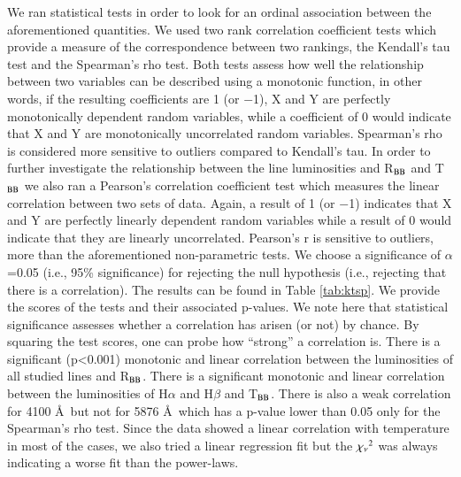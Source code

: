 \documentclass[structabstract]{aa}
\begin{document}
We ran statistical tests in order to look for an ordinal association between the aforementioned quantities. We used two rank correlation coefficient tests which provide a measure of the correspondence between two rankings, the Kendall's tau test and the Spearman's rho test. Both tests assess how well the relationship between two variables can be described using a monotonic function, in other words, if the resulting coefficients are 1 (or $-$1), X and Y are perfectly monotonically dependent random variables, while a coefficient of 0 would indicate that X and Y are monotonically uncorrelated random variables. Spearman's rho is considered more sensitive to outliers compared to Kendall's tau. %
In order to further investigate the relationship between the line luminosities and R$_{\rm BB}$ and T$_{\rm BB}$ we also ran a Pearson's correlation coefficient test which measures the linear correlation between two sets of data. Again, a result of 1 (or $-$1) indicates that X and Y are perfectly linearly dependent random variables while a result of 0 would indicate that they are linearly uncorrelated. Pearson's r is sensitive to outliers, more than the aforementioned non-parametric tests. We choose a significance of $\alpha$=0.05 (i.e., 95\% significance) for rejecting the null hypothesis (i.e., rejecting that there is a correlation). The results can be found in Table \ref{tab:ktsp}. We provide the scores of the tests and their associated p-values. 
We note here that statistical significance assesses whether a correlation has arisen (or not) by chance. By squaring the test scores, one can probe how ``strong'' a correlation is.
There is a significant (p<0.001) monotonic and linear correlation between the luminosities of all studied lines and R$_{\rm BB}$. There is a significant monotonic and linear correlation between the luminosities of H$\alpha$ and H$\beta$ and T$_{\rm BB}$. There is also a weak correlation for  4100 \AA\, but not for  5876 \AA\, which has a p-value lower than 0.05 only for the Spearman's rho test. Since the data showed a linear correlation with temperature in most of the cases, we also tried a linear regression fit but the ${\rm \chi_{\rm \nu}}^{2}$ was always indicating a worse fit than the power-laws. 
\end{document}
